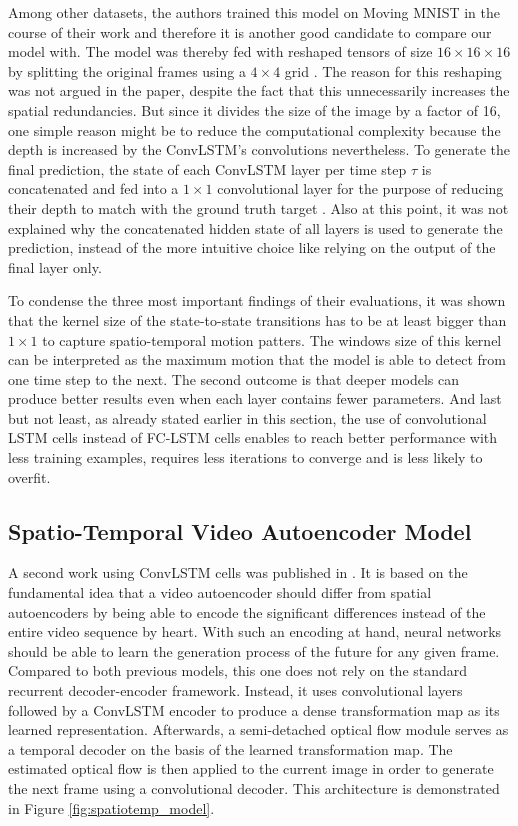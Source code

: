 Among other datasets, the authors trained this model on Moving MNIST in the course of their work and therefore it is another good candidate to compare our model with. The model was thereby fed with reshaped tensors of size $16 \times 16 \times 16$ by splitting the original frames using a $4 \times 4$ grid \parencite[p. 6]{conv_lstm_nowcasting}. The reason for this reshaping was not argued in the paper, despite the fact that this unnecessarily increases the spatial redundancies. But since it divides the size of the image by a factor of 16, one simple reason might be to reduce the computational complexity because the depth is increased by the ConvLSTM's convolutions nevertheless. To generate the final prediction, the state of each ConvLSTM layer per time step $\tau$ is concatenated and fed into a $1 \times 1$ convolutional layer for the purpose of reducing their depth to match with the ground truth target \parencite[p. 4]{conv_lstm_nowcasting}. Also at this point, it was not explained why the concatenated hidden state of all layers is used to generate the prediction, instead of the more intuitive choice like relying on the output of the final layer only.

To condense the three most important findings of their evaluations, it was shown that the kernel size of the state-to-state transitions has to be at least bigger than $1 \times 1$ to capture spatio-temporal motion patters. The windows size of this kernel can be interpreted as the maximum motion that the model is able to detect from one time step to the next. The second outcome is that deeper models can produce better results even when each layer contains fewer parameters. And last but not least, as already stated earlier in this section, the use of convolutional LSTM cells instead of FC-LSTM cells enables to reach better performance with less training examples, requires less iterations to converge and is less likely to overfit.


\subsection{Spatio-Temporal Video Autoencoder Model}

A second work using ConvLSTM cells was published in \parencite{spat_temp_video_autoenc}. It is based on the fundamental idea that a video autoencoder should differ from spatial autoencoders by being able to encode the significant differences instead of the entire video sequence by heart. With such an encoding at hand, neural networks should be able to learn the generation process of the future for any given frame. Compared to both previous models, this one does not rely on the standard recurrent decoder-encoder framework. Instead, it uses convolutional layers followed by a ConvLSTM encoder to produce a dense transformation map as its learned representation. Afterwards, a semi-detached optical flow module serves as a temporal decoder on the basis of the learned transformation map. The estimated optical flow is then applied to the current image in order to generate the next frame using a convolutional decoder. This architecture is demonstrated in Figure \ref{fig:spatiotemp_model}.

